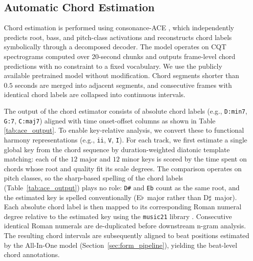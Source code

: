 \documentclass{article}
\begin{document}
\subsection{Automatic Chord Estimation}
\label{sec:ace_pipeline}
Chord estimation is performed using consonance-ACE \citep{poltronieri2025discord}, which independently predicts root, bass, and pitch-class activations and reconstructs chord labels symbolically through a decomposed decoder. The model operates on CQT spectrograms computed over 20-second chunks and outputs frame-level chord predictions with no constraint to a fixed vocabulary. We use the publicly available pretrained model without modification. Chord segments shorter than $0.5$ seconds are merged into adjacent segments, and consecutive frames with identical chord labels are collapsed into continuous intervals.

The output of the chord estimator consists of absolute chord labels (e.g., \texttt{D:min7}, \texttt{G:7}, \texttt{C:maj7}) aligned with time onset-offset columns as shown in Table \ref{tab:ace_output}. To enable key-relative analysis, we convert these to functional harmony representations (e.g., \texttt{ii}, \texttt{V}, \texttt{I}). For each track, we first estimate a single global key from the chord sequence by duration-weighted diatonic template matching: each of the $12$ major and $12$ minor keys is scored by the time spent on chords whose root and quality fit its scale degrees. The comparison operates on pitch classes, so the sharp-based spelling of the chord labels (Table~\ref{tab:ace_output}) plays no role: \texttt{D\#} and \texttt{Eb} count as the same root, and the estimated key is spelled conventionally (E$\flat$~major rather than D$\sharp$~major). Each absolute chord label is then mapped to its corresponding Roman numeral degree relative to the estimated key using the \texttt{music21} library \citep{cuthbert2010music21}. Consecutive identical Roman numerals are de-duplicated before downstream n-gram analysis. The resulting chord intervals are subsequently aligned to beat positions estimated by the All-In-One model (Section~\ref{sec:form_pipeline}), yielding the beat-level chord annotations.
\end{document}
